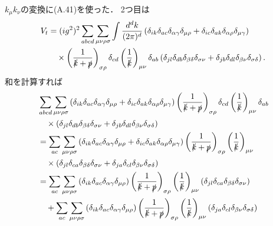 $k_\mu k_\nu$の変換に(A.41)を使った．
2つ目は
\begin{align*}
  V_t &= (ig^2)^2 \sum_{abcd} \sum_{\mu\nu\rho\sigma} \int \frac{d^dk}{(2\pi)^d}
  \left( \delta_{ik} \delta_{ac} \delta_{\alpha\gamma} \delta_{\mu\rho} + \delta_{ic} \delta_{ak} \delta_{\alpha\rho} \delta_{\mu\gamma} \right) \\
  & \quad\times \left( \frac{1}{\slashed{k} + \slashed{p}} \right)_{\sigma\rho} \delta_{cd}
  \left( \frac{1}{\slashed{k}} \right)_{\mu\nu} \delta_{ab}
  \left( \delta_{jl} \delta_{db} \delta_{\beta\delta} \delta_{\sigma\nu} + \delta_{jb} \delta_{dl} \delta_{\beta\nu} \delta_{\sigma\delta} \right) .
\end{align*}
和を計算すれば
\begin{align*}
  & \sum_{abcd} \sum_{\mu\nu\rho\sigma}
  \left( \delta_{ik} \delta_{ac} \delta_{\alpha\gamma} \delta_{\mu\rho} + \delta_{ic} \delta_{ak} \delta_{\alpha\rho} \delta_{\mu\gamma} \right)
  \left( \frac{1}{\slashed{k} + \slashed{p}} \right)_{\sigma\rho} \delta_{cd}
  \left( \frac{1}{\slashed{k}} \right)_{\mu\nu} \delta_{ab} \\
  & \quad\times \left( \delta_{jl} \delta_{db} \delta_{\beta\delta} \delta_{\sigma\nu} + \delta_{jb} \delta_{dl} \delta_{\beta\nu} \delta_{\sigma\delta} \right) \\
  &= \sum_{ac} \sum_{\mu\nu\rho\sigma}
  \left( \delta_{ik} \delta_{ac} \delta_{\alpha\gamma} \delta_{\mu\rho} + \delta_{ic} \delta_{ak} \delta_{\alpha\rho} \delta_{\mu\gamma} \right)
  \left( \frac{1}{\slashed{k} + \slashed{p}} \right)_{\sigma\rho}
  \left( \frac{1}{\slashed{k}} \right)_{\mu\nu} \\
  & \quad\times \left( \delta_{jl} \delta_{ca} \delta_{\beta\delta} \delta_{\sigma\nu} + \delta_{ja} \delta_{cl} \delta_{\beta\nu} \delta_{\sigma\delta} \right) \\
  &= \sum_{ac} \sum_{\mu\nu\rho\sigma}
  \left( \delta_{ik} \delta_{ac} \delta_{\alpha\gamma} \delta_{\mu\rho} \right)
  \left( \frac{1}{\slashed{k} + \slashed{p}} \right)_{\sigma\rho}
  \left( \frac{1}{\slashed{k}} \right)_{\mu\nu}
  \left( \delta_{jl} \delta_{ca} \delta_{\beta\delta} \delta_{\sigma\nu} \right) \\
  & \quad + \sum_{ac} \sum_{\mu\nu\rho\sigma}
  \left( \delta_{ik} \delta_{ac} \delta_{\alpha\gamma} \delta_{\mu\rho} \right)
  \left( \frac{1}{\slashed{k} + \slashed{p}} \right)_{\sigma\rho}
  \left( \frac{1}{\slashed{k}} \right)_{\mu\nu}
  \left( \delta_{ja} \delta_{cl} \delta_{\beta\nu} \delta_{\sigma\delta} \right) \\

\end{align*}
